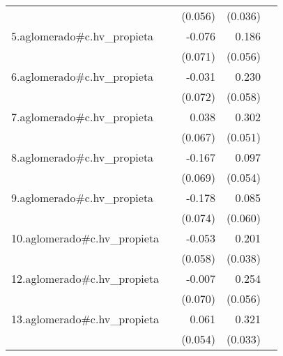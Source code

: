 {\begin{longtable}{l*{4}{D{.}{.}{-1}}}
            &                     &     (0.056)         &     (0.036)         &                     \\
\addlinespace
5.aglomerado#c.hv\_propieta&                     &      -0.076         &       0.186\sym{***}&                     \\
            &                     &     (0.071)         &     (0.056)         &                     \\
\addlinespace
6.aglomerado#c.hv\_propieta&                     &      -0.031         &       0.230\sym{***}&                     \\
            &                     &     (0.072)         &     (0.058)         &                     \\
\addlinespace
7.aglomerado#c.hv\_propieta&                     &       0.038         &       0.302\sym{***}&                     \\
            &                     &     (0.067)         &     (0.051)         &                     \\
\addlinespace
8.aglomerado#c.hv\_propieta&                     &      -0.167\sym{*}  &       0.097         &                     \\
            &                     &     (0.069)         &     (0.054)         &                     \\
\addlinespace
9.aglomerado#c.hv\_propieta&                     &      -0.178\sym{*}  &       0.085         &                     \\
            &                     &     (0.074)         &     (0.060)         &                     \\
\addlinespace
10.aglomerado#c.hv\_propieta&                     &      -0.053         &       0.201\sym{***}&                     \\
            &                     &     (0.058)         &     (0.038)         &                     \\
\addlinespace
12.aglomerado#c.hv\_propieta&                     &      -0.007         &       0.254\sym{***}&                     \\
            &                     &     (0.070)         &     (0.056)         &                     \\
\addlinespace
13.aglomerado#c.hv\_propieta&                     &       0.061         &       0.321\sym{***}&                     \\
            &                     &     (0.054)         &     (0.033)         &                     \\

\end{longtable}}

